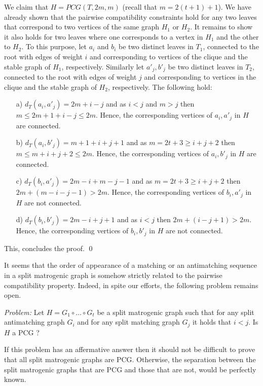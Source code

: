 \documentclass[dvipdfm]{llncs}
\begin{document}
We claim that $H=PCG(T,2m,m)$ (recall that $m=2(t+1)+1$). We have already shown that the pairwise compatibility constraints hold for any two leaves that correspond to two vertices of the same graph $H_1$ or  $H_2$. It remains to show it also holds for two leaves  where one corresponds to a vertex in $H_1$ and the other to $H_2$. To this purpose, let $a_i$ and $b_i$ be two distinct leaves in $T_1$, connected to the root with edges of weight $i$ and  corresponding to vertices of the clique and the stable graph of $H_1$, respectively. Similarly let $a'_j, b'_j$ be two distinct leaves in $T_2$, connected to the root with edges of weight $j$ and corresponding to vertices in the clique and the stable graph of $H_2$, respectively. The following hold:

\begin{itemize}
\item[a)] $d_T(a_i,a'_j)=2m+i-j$ and as $i < j$ and $m>j$ then $m \leq 2m+1+i-j\leq 2m$. Hence, the corresponding vertices of $a_i, a'_j$ in $H$ are connected.
\item[b)] $d_T(a_i,b'_j)=m+1+i+j+1$ and as $m=2t+3 \geq i+j+2$ then $m \leq m+i+j+2 \leq 2m$.  Hence, the corresponding vertices of $a_i, b'_j$ in $H$ are connected.
\item[c)] $d_T(b_i,a'_j)=2m-i+m-j-1$ and as $m=2t+3 \geq i+j+2$ then $2m+(m-i-j-1) > 2m$. Hence, the corresponding vertices of $b_i, a'_j$ in $H$ are not connected.
\item[d)] $d_T(b_i,b'_j)=2m-i+j+1$ and as $i<j$ then $2m+(i-j+1) > 2m$. Hence, the corresponding vertices of $b_i, b'_j$ in $H$ are not connected.
\end{itemize}

This, concludes the proof. \qed




It seems that the order of appearance of a matching or an antimatching sequence in a split matrogenic graph is somehow strictly related to the pairwise compatibility property.  Indeed, in spite our efforts, the following problem remains open.

\textit{Problem:} Let $H=G_1 \circ \ldots \circ G_t$ be a split matrogenic graph such that for any split antimatching graph $G_i$ and for any split matching graph $G_j$ it holds  that $i<j$. Is $H$ a PCG ?

If this problem has an affermative answer then it should not be difficult to prove that all split matrogenic graphs are PCG. Otherwise, the separation between the split matrogenic graphs that are PCG and those that are not, would be perfectly known. 
\end{document}
